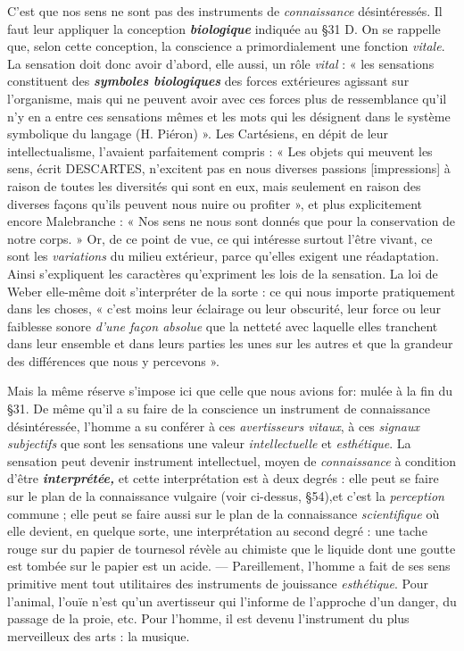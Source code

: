 C’est que nos sens ne sont pas des instruments de {\it connaissance}
désintéressés. Il faut leur appliquer la conception \textbf{\textit {biologique}} indiquée
au \S 31 D. On se rappelle que, selon cette conception, la conscience
a primordialement une fonction {\it vitale}. La sensation doit donc
avoir d’abord, elle aussi, un rôle {\it vital} : « les sensations constituent
des \textbf{\textit {symboles biologiques}} des forces extérieures agissant sur l’organisme,
mais qui ne peuvent avoir avec ces forces plus de ressemblance
qu’il n’y en a entre ces sensations mêmes et les mots qui
les désignent dans le système symbolique du langage (H. Piéron) ».
Les Cartésiens, en dépit de leur intellectualisme, l’avaient parfaitement
compris : « Les objets qui meuvent les sens, écrit DESCARTES,
n’excitent pas en nous diverses passions [impressions] à raison de
toutes les diversités qui sont en eux, mais seulement en raison des
diverses façons qu’ils peuvent nous nuire ou profiter », et plus explicitement
encore Malebranche : « Nos sens ne nous sont donnés que
pour la conservation de notre corps. » Or, de ce point de vue, ce qui
intéresse surtout l’être vivant, ce sont les {\it variations} du milieu extérieur,
parce qu’elles exigent une réadaptation. Ainsi s'expliquent les
caractères qu’expriment les lois de la sensation. La loi de Weber
elle-même doit s’interpréter de la sorte : ce qui nous importe pratiquement
dans les choses, « c’est moins leur éclairage ou leur obscurité, leur
force ou leur faiblesse sonore {\it d’une façon absolue} que la netteté avec
laquelle elles tranchent dans leur ensemble et dans leurs parties les
unes sur les autres et que la grandeur des différences que nous y
percevons ».

Mais la même réserve s'impose ici que celle que nous avions for:
mulée à la fin du \S 31. De même qu'il a su faire de la conscience un
instrument de connaissance désintéressée, l’homme a su conférer à
ces {\it avertisseurs vitaux}, à ces {\it signaux subjectifs} que sont les sensations
une valeur {\it intellectuelle} et {\it esthétique}. La sensation peut devenir instrument
intellectuel, moyen de {\it connaissance} à condition d’être \textbf{\textit {interprétée,}}
et cette interprétation est à deux degrés : elle peut se faire
sur le plan de la connaissance vulgaire (voir ci-dessus, \S 54),et c’est
la {\it perception} commune ; elle peut se faire aussi sur le plan de la connaissance
{\it scientifique} où elle devient, en quelque sorte, une interprétation
au second degré : une tache rouge sur du papier de tournesol révèle
au chimiste que le liquide dont une goutte est tombée sur le papier
est un acide. — Pareillement, l’homme a fait de ses sens primitive
ment tout utilitaires des instruments de jouissance {\it esthétique}. Pour
l'animal, l’ouïe n’est qu’un avertisseur qui l’informe de l'approche
d'un danger, du passage de la proie, etc. Pour l’homme, il est
devenu l'instrument du plus merveilleux des arts : la musique.

